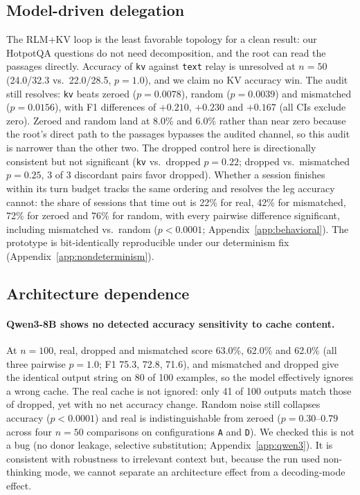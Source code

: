 \documentclass[11pt]{article}
\begin{document}
\subsection{Model-driven delegation}

The RLM+KV loop is the least favorable topology for a clean result: our
HotpotQA questions do not need decomposition, and the root can read the
passages directly. Accuracy of \texttt{kv} against \texttt{text} relay is
unresolved at $n{=}50$ (24.0/32.3 vs.\ 22.0/28.5, $p=1.0$), and we claim
no KV accuracy win. The audit still resolves: \texttt{kv} beats zeroed
($p=0.0078$), random ($p=0.0039$) and mismatched ($p=0.0156$), with F1
differences of $+0.210$, $+0.230$ and $+0.167$ (all CIs exclude zero).
Zeroed and random land at 8.0\% and 6.0\% rather than near zero because
the root's direct path to the passages bypasses the audited channel, so
this audit is narrower than the other two. The dropped control here is
directionally consistent but not significant (\texttt{kv} vs.\ dropped
$p=0.22$; dropped vs.\ mismatched $p=0.25$, 3 of 3 discordant pairs favor
dropped). Whether a session finishes within its turn budget tracks the
same ordering and resolves the leg accuracy cannot: the share of sessions
that time out is 22\% for real, 42\% for mismatched, 72\% for zeroed and 76\%
for random, with every pairwise difference significant, including mismatched
vs.\ random ($p<0.0001$; Appendix~\ref{app:behavioral}). The prototype is
bit-identically reproducible under our determinism fix
(Appendix~\ref{app:nondeterminism}).

\subsection{Architecture dependence}

\paragraph{Qwen3-8B shows no detected accuracy sensitivity to cache content.}
At $n{=}100$, real, dropped and mismatched score 63.0\%, 62.0\% and 62.0\% (all
three pairwise $p=1.0$; F1 75.3, 72.8, 71.6), and mismatched and dropped give the
identical output string on 80 of 100 examples, so the model effectively
ignores a wrong cache. The real cache is not ignored: only 41 of 100 outputs match
those of dropped, yet with no net accuracy change. Random noise still collapses
accuracy ($p<0.0001$) and real is indistinguishable from zeroed
($p=0.30$--$0.79$ across four $n{=}50$ comparisons on configurations \texttt{A} and
\texttt{D}). We checked this is not a bug (no donor leakage, selective
substitution; Appendix~\ref{app:qwen3}).
It is consistent with robustness to irrelevant context but, because the
run used non-thinking mode, we cannot separate an architecture effect from
a decoding-mode effect.
\end{document}
